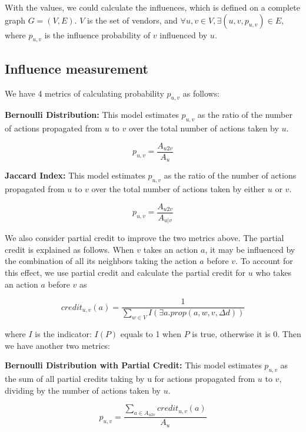 With the values, we could calculate the influences, which is defined on a complete graph $G= (V,E)$. $V$ is the set of vendors, and $\forall u,v \in V, \exists (u,v,p_{u,v}) \in E$, where 
$p_{u,v}$ is the influence probability of $v$ influenced by $u$. 

\subsection{Influence measurement}
We have 4 metrics of calculating probability $p_{u,v}$ as follows:

\textbf{Bernoulli Distribution:} This model estimates $p_{u,v}$ as the ratio of the number of actions propagated from $u$ to $v$ over the total number of actions taken by $u$.

\begin{equation}
p_{u,v} = \frac{A_{u2v}}{A_u}
\end{equation}

\textbf{Jaccard Index:} This model estimates $p_{u,v}$ as the ratio of the number of actions propagated from $u$ to $v$ over the total number of actions taken by either $u$ or $v$.

\begin{equation}
p_{u,v} = \frac{A_{u2v}}{A_{u|v}}
\end{equation}

We also consider partial credit to improve the two metrics above.
The partial credit is explained as follows. When $v$ takes an action $a$, it may be influenced by the combination of all its neighbors taking the action $a$ before $v$. To account for this effect, we use partial credit and calculate the partial credit for $u$ who takes an action $a$ before $v$ as

\begin{equation}
credit_{u,v}(a) = \frac{1}{\sum_{w \in V}I(\exists a. prop(a, w, v, \Delta d))}
\end{equation}

where $I$ is the indicator: $I(P)$ equals to 1 when $P$ is true, otherwise it is 0. Then we have another two metrics:

\textbf{Bernoulli Distribution with Partial Credit:} This model estimates $p_{u,v}$ as the sum of all partial credits taking by u for actions propagated from $u$ to $v$, dividing by the number of actions taken by $u$.

\begin{equation}
p_{u,v} = \frac{\sum_{a\in A_{u2v}}credit_{u,v}(a)}{A_{u}}
\end{equation}

